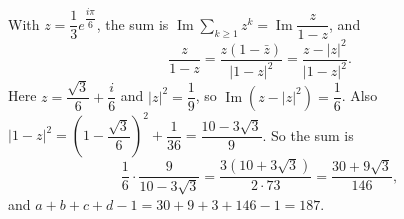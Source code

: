 With $z=\dfrac13e^{\dfrac{i\pi}{6}}$, the sum is $\operatorname{Im}\displaystyle\sum_{k\ge1}z^k=\operatorname{Im}\dfrac{z}{1-z}$, and
\[\dfrac{z}{1-z}=\dfrac{z(1-\bar z)}{|1-z|^2}=\dfrac{z-|z|^2}{|1-z|^2}.\]
Here $z=\dfrac{\sqrt3}{6}+\dfrac i6$ and $|z|^2=\dfrac19$, so $\operatorname{Im}\left(z-|z|^2\right)=\dfrac16$. Also $|1-z|^2=\left(1-\dfrac{\sqrt3}{6}\right)^2+\dfrac1{36}=\dfrac{10-3\sqrt3}{9}$. So the sum is
\[\dfrac16\cdot\dfrac{9}{10-3\sqrt3}=\dfrac{3\left(10+3\sqrt3\right)}{2\cdot73}=\dfrac{30+9\sqrt3}{146},\]
and $a+b+c+d-1=30+9+3+146-1=\boxed{187}$.
